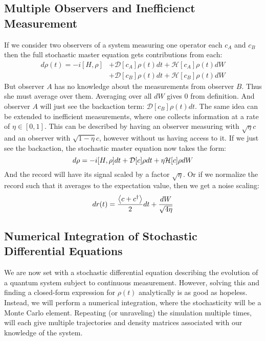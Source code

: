 \subsection{Multiple Observers and Inefficienct Measurement}\label{sec:sme_inefficient}
If we consider two observers of a system measuring one operator each $c_A$ and $c_B$ then the full stochastic master equation gets contributions from each:
\begin{align*}
    d\rho(t) = -i[H, \rho] &+ \mathcal{D}[c_A]\rho(t) dt + \mathcal{H}[c_A]\rho(t) dW \\
                           &+ \mathcal{D}[c_B]\rho(t) dt + \mathcal{H}[c_B]\rho(t) dW
\end{align*}
But observer $A$ has no knowledge about the measurements from observer $B$. Thus she must average over them. Averaging over all $dW$ gives $0$ from definition. And observer $A$ will just see the backaction term: $\mathcal{D}[c_B] \rho(t) dt$.  The same idea can be extended to inefficient measurements, where one collects information at a rate of $\eta\in[0, 1]$. This can be described by having an observer measuring with $\sqrt{\eta} c$ and an observer with $\sqrt{1 - \eta}c$, however without us having access to it. If we just see the backaction, the stochastic master equation now takes the form:
\begin{equation}
    d\rho = -i \comm{H}{\rho}dt + \mathcal{D}[c]\rho dt + \eta \mathcal{H}[c] \rho dW
\end{equation}
And the record will have its signal scaled by a factor $\sqrt{\eta}$. Or if we normalize the record such that it averages to the expectation value, then we get a noise scaling:
\begin{equation}
    dr(t) = \frac{\expval{c + c^\dagger}}{2}dt + \frac{dW}{\sqrt{4\eta}}
\end{equation}

\subsection{Numerical Integration of Stochastic Differential Equations}
We are now set with a stochastic differential equation describing the evolution of a quantum system subject to continuous measurement. However, solving this and finding a closed-form expression for $\rho(t)$ analytically is as good as hopeless. Instead, we will perform a numerical integration, where the stochasticity will be a Monte Carlo element. Repeating (or unraveling) the simulation multiple times, will each give multiple trajectories and density matrices associated with our knowledge of the system. 

